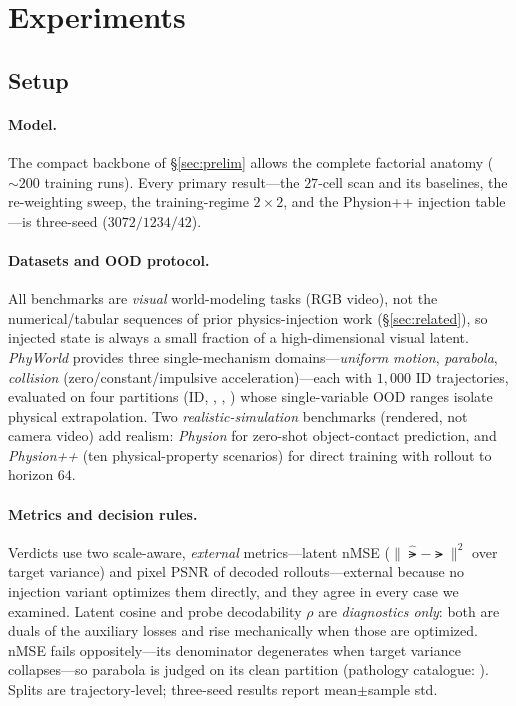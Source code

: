\section{Experiments}
\label{sec:exp}

\subsection{Setup}
\label{sec:setup}

\paragraph{Model.}
The compact backbone of \S\ref{sec:prelim} allows the complete factorial anatomy (${\sim}200$ training runs). Every primary result---the $27$-cell scan and its baselines, the re-weighting sweep, the training-regime $2{\times}2$, and the Physion++ injection table---is three-seed ($3072/1234/42$).

\paragraph{Datasets and OOD protocol.}
All benchmarks are \emph{visual} world-modeling tasks (RGB video), not the numerical/tabular sequences of prior physics-injection work (\S\ref{sec:related}), so injected state is always a small fraction of a high-dimensional visual latent. \emph{PhyWorld} \citep{kang2025how} provides three single-mechanism domains---\emph{uniform motion}, \emph{parabola}, \emph{collision} (zero/constant/impulsive acceleration)---each with $1{,}000$ ID trajectories, evaluated on four partitions (ID, \rmood{}, \vood{}, \bothood{}) whose single-variable OOD ranges isolate physical extrapolation. Two \emph{realistic-simulation} benchmarks (rendered, not camera video) add realism: \emph{Physion} \citep{bear2021physion} for zero-shot object-contact prediction, and \emph{Physion++} \citep{tung2023physionpp} (ten physical-property scenarios) for direct training with rollout to horizon $64$.

\paragraph{Metrics and decision rules.}
Verdicts use two scale-aware, \emph{external} metrics---latent nMSE ($\|\hat{\lat}-\lat\|^2$ over target variance) and pixel PSNR of decoded rollouts---external because no injection variant optimizes them directly, and they agree in every case we examined. Latent cosine and probe decodability $\rho$ \citep{alain2016probes} are \emph{diagnostics only}: both are duals of the auxiliary losses and rise mechanically when those are optimized. nMSE fails oppositely---its denominator degenerates when target variance collapses---so parabola is judged on its clean \rmood{} partition (pathology catalogue: ). Splits are trajectory-level; three-seed results report mean$\pm$sample std.

